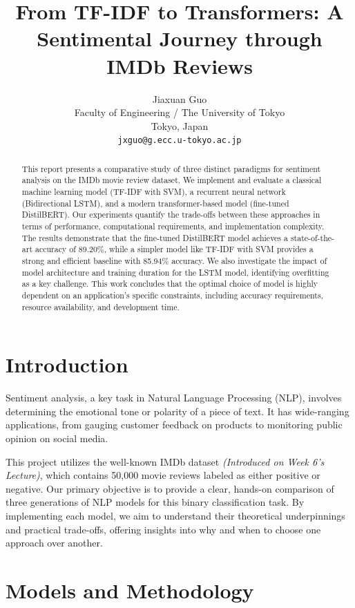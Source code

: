 \documentclass[11pt]{article}
\title{From TF-IDF to Transformers: A Sentimental Journey through IMDb Reviews}
\author{Jiaxuan Guo \\
  Faculty of Engineering / The University of Tokyo \\
  Tokyo, Japan \\
  \texttt{jxguo@g.ecc.u-tokyo.ac.jp} }
\begin{document}
\maketitle
\begin{abstract}
This report presents a comparative study of three distinct paradigms for sentiment analysis on the IMDb movie review dataset. We implement and evaluate a classical machine learning model (TF-IDF with SVM), a recurrent neural network (Bidirectional LSTM), and a modern transformer-based model (fine-tuned DistilBERT). Our experiments quantify the trade-offs between these approaches in terms of performance, computational requirements, and implementation complexity. The results demonstrate that the fine-tuned DistilBERT model achieves a state-of-the-art accuracy of 89.20\%, while a simpler model like TF-IDF with SVM provides a strong and efficient baseline with 85.94\% accuracy. We also investigate the impact of model architecture and training duration for the LSTM model, identifying overfitting as a key challenge. This work concludes that the optimal choice of model is highly dependent on an application's specific constraints, including accuracy requirements, resource availability, and development time.
\end{abstract}

\section{Introduction}

Sentiment analysis, a key task in Natural Language Processing (NLP), involves determining the emotional tone or polarity of a piece of text. It has wide-ranging applications, from gauging customer feedback on products to monitoring public opinion on social media.

This project utilizes the well-known IMDb dataset \textit{(Introduced on Week 6's Lecture)}, which contains 50,000 movie reviews labeled as either positive or negative. Our primary objective is to provide a clear, hands-on comparison of three generations of NLP models for this binary classification task. By implementing each model, we aim to understand their theoretical underpinnings and practical trade-offs, offering insights into why and when to choose one approach over another.

\section{Models and Methodology}
\end{document}
